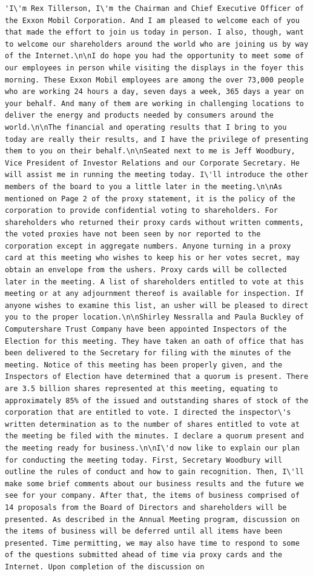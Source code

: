 \documentclass[
  letterpaper,
  DIV=11,
  numbers=noendperiod]{scrreprt}
\begin{document}
\begin{verbatim}
'I\'m Rex Tillerson, I\'m the Chairman and Chief Executive Officer of the Exxon Mobil Corporation. And I am pleased to welcome each of you that made the effort to join us today in person. I also, though, want to welcome our shareholders around the world who are joining us by way of the Internet.\n\nI do hope you had the opportunity to meet some of our employees in person while visiting the displays in the foyer this morning. These Exxon Mobil employees are among the over 73,000 people who are working 24 hours a day, seven days a week, 365 days a year on your behalf. And many of them are working in challenging locations to deliver the energy and products needed by consumers around the world.\n\nThe financial and operating results that I bring to you today are really their results, and I have the privilege of presenting them to you on their behalf.\n\nSeated next to me is Jeff Woodbury, Vice President of Investor Relations and our Corporate Secretary. He will assist me in running the meeting today. I\'ll introduce the other members of the board to you a little later in the meeting.\n\nAs mentioned on Page 2 of the proxy statement, it is the policy of the corporation to provide confidential voting to shareholders. For shareholders who returned their proxy cards without written comments, the voted proxies have not been seen by nor reported to the corporation except in aggregate numbers. Anyone turning in a proxy card at this meeting who wishes to keep his or her votes secret, may obtain an envelope from the ushers. Proxy cards will be collected later in the meeting. A list of shareholders entitled to vote at this meeting or at any adjournment thereof is available for inspection. If anyone wishes to examine this list, an usher will be pleased to direct you to the proper location.\n\nShirley Nessralla and Paula Buckley of Computershare Trust Company have been appointed Inspectors of the Election for this meeting. They have taken an oath of office that has been delivered to the Secretary for filing with the minutes of the meeting. Notice of this meeting has been properly given, and the Inspectors of Election have determined that a quorum is present. There are 3.5 billion shares represented at this meeting, equating to approximately 85% of the issued and outstanding shares of stock of the corporation that are entitled to vote. I directed the inspector\'s written determination as to the number of shares entitled to vote at the meeting be filed with the minutes. I declare a quorum present and the meeting ready for business.\n\nI\'d now like to explain our plan for conducting the meeting today. First, Secretary Woodbury will outline the rules of conduct and how to gain recognition. Then, I\'ll make some brief comments about our business results and the future we see for your company. After that, the items of business comprised of 14 proposals from the Board of Directors and shareholders will be presented. As described in the Annual Meeting program, discussion on the items of business will be deferred until all items have been presented. Time permitting, we may also have time to respond to some of the questions submitted ahead of time via proxy cards and the Internet. Upon completion of the discussion on 
\end{verbatim}
\end{document}
